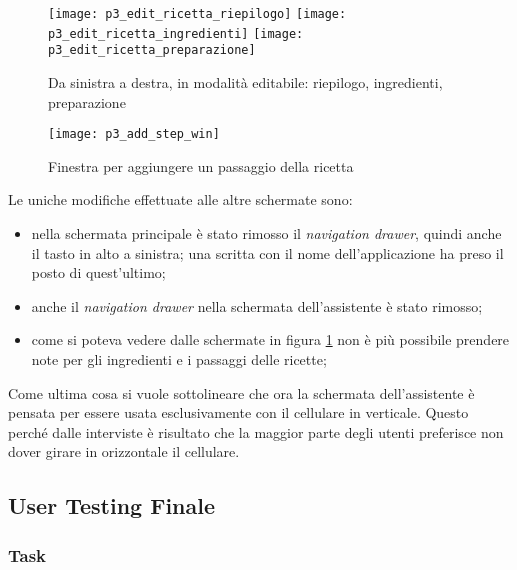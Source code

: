 \begin{figure}[ht]
  \begin{center}
    \texttt{[image: p3\_edit\_ricetta\_riepilogo]}
    \texttt{[image: p3\_edit\_ricetta\_ingredienti]}
    \texttt{[image: p3\_edit\_ricetta\_preparazione]} %
    \caption{Da sinistra a destra, in modalità editabile: riepilogo, ingredienti, preparazione}
    \label{fig:p3_edit_ricetta}
  \end{center}
\end{figure}
\begin{figure}[ht]
  \begin{center}
    \texttt{[image: p3\_add\_step\_win]}
    \caption{Finestra per aggiungere un passaggio della ricetta}
    \label{fig:p3_add_step_window}
  \end{center}
\end{figure}

\clearpage

Le uniche modifiche effettuate alle altre schermate sono:
\begin{itemize}
  \item nella schermata principale è stato rimosso il \textit{navigation drawer}, quindi anche il tasto in alto a sinistra; una scritta con il nome dell'applicazione ha preso il posto di quest'ultimo;

  \item anche il \textit{navigation drawer} nella schermata dell'assistente è stato rimosso;

  \item come si poteva vedere dalle schermate in figura \ref{fig:p3_edit_ricetta} non è più possibile prendere note per gli ingredienti e i passaggi delle ricette;
\end{itemize}

Come ultima cosa si vuole sottolineare che ora la schermata dell'assistente è pensata per essere usata esclusivamente con il cellulare in verticale.
Questo perché dalle interviste è risultato che la maggior parte degli utenti preferisce non dover girare in orizzontale il cellulare.

\clearpage
\subsection{User Testing Finale}
\subsubsection{Task}
